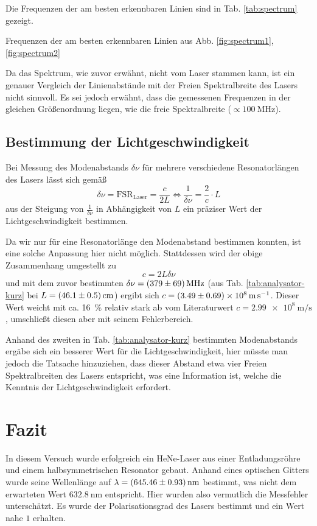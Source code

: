 \documentclass{article}
\newcommand*{\tablePath}{../data} %
\newcommand{\mr}{\mathrm}
\begin{document}
Die Frequenzen der am besten erkennbaren Linien sind in Tab. \ref{tab:spectrum} gezeigt.
\begin{table}[h]
  
  \caption{Frequenzen der am besten erkennbaren Linien aus Abb. \ref{fig:spectrum1}, \ref{fig:spectrum2}}
  \label{tab:spectrum}
\end{table}
Da das Spektrum, wie zuvor erwähnt, nicht vom Laser stammen kann, ist ein genauer Vergleich der Linienabstände
mit der Freien Spektralbreite des Lasers nicht sinnvoll. Es sei jedoch erwähnt, dass die gemessenen Frequenzen in
der gleichen Größenordnung liegen, wie die freie Spektralbreite ($\propto \SI{100}{\MHz}$).


\subsection{Bestimmung der Lichtgeschwindigkeit}
Bei Messung des Modenabstands $\delta\nu$ für mehrere verschiedene Resonatorlängen des Lasers lässt sich gemäß
\[
  \delta\nu = \mr{FSR}_\mr{Laser} = \frac{c}{2L} \iff \frac{1}{\delta\nu} = \frac{2}{c}\cdot L
\]
aus der Steigung von $\frac{1}{\delta\nu}$ in Abhängigkeit von $L$ ein präziser Wert der Lichtgeschwindigkeit bestimmen.

Da wir nur für eine Resonatorlänge den Modenabstand bestimmen konnten, ist eine solche Anpassung hier nicht möglich.
Stattdessen wird der obige Zusammenhang umgestellt zu
\[
  c = 2L\delta\nu
\]
und mit dem zuvor bestimmten $\delta\nu = \SI{379\pm69}{\MHz}$ (aus Tab. \ref{tab:analysator-kurz} bei $L=\SI{46.1\pm0.5}{\cm}$)
ergibt sich $c=\SI{3.49\pm0.69e8}{\m\per\s}$. Dieser Wert weicht mit ca. \SI{16}{\percent}
relativ stark ab vom Literaturwert $ c =\SI{2.99e8}{\m\per\s}$ \cite{c}, umschließt diesen aber mit seinem Fehlerbereich.

Anhand des zweiten in Tab. \ref{tab:analysator-kurz} bestimmten Modenabstands ergäbe sich ein besserer Wert für die
Lichtgeschwindigkeit, hier müsste man jedoch die Tatsache hinzuziehen, dass dieser Abstand etwa vier Freien Spektralbreiten
des Lasers entspricht, was eine Information ist, welche die Kenntnis der Lichtgeschwindigkeit erfordert.


\section{Fazit}
In diesem Versuch wurde erfolgreich ein HeNe-Laser aus einer Entladungsröhre und einem halbsymmetrischen Resonator gebaut.
Anhand eines optischen Gitters wurde seine Wellenlänge auf $\lambda = \SI{645.46 \pm 0.93}{\nm}$ bestimmt, was
nicht dem erwarteten Wert $\SI{632.8}{\nm}$ \cite{Anleitung} entspricht. Hier wurden also vermutlich die Messfehler unterschätzt.
Es wurde der Polarisationsgrad des Lasers bestimmt und ein Wert nahe $1$ erhalten.
\end{document}
